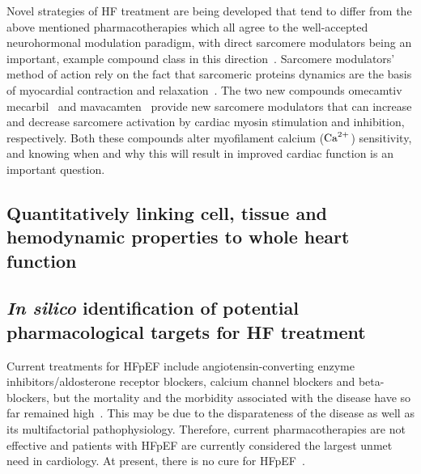 \vspace{0.2cm}
Novel strategies of HF treatment are being developed that tend to differ from the above mentioned pharmacotherapies which all agree to the well-accepted neurohormonal modulation paradigm, with direct sarcomere modulators being an important, example compound class in this direction~\cite{Tsukamoto:2020}. Sarcomere modulators' method of action rely on the fact that sarcomeric proteins dynamics are the basis of myocardial contraction and relaxation~\cite{Solaro:1998}. The two new compounds omecamtiv mecarbil~\cite{Teerlink:2016} and mavacamten~\cite{Olivotto:2020} provide new sarcomere modulators that can increase and decrease sarcomere activation by cardiac myosin stimulation and inhibition, respectively. Both these compounds alter myofilament calcium ($\textrm{Ca}^{2+}$) sensitivity, and knowing when and why this will result in improved cardiac function is an important question.


%
%
%
\subsection{Quantitatively linking cell, tissue and hemodynamic properties to whole heart function}


%
%
%
\subsection{\textit{In silico} identification of potential pharmacological targets for HF treatment}
Current treatments for HFpEF include angiotensin-converting enzyme inhibitors/aldosterone receptor blockers, calcium channel
blockers and beta-blockers, but the mortality and the morbidity associated with the
disease have so far remained high~\cite{Adamczak:2020}. This may be due to the disparateness of the disease as well as its multifactorial pathophysiology. Therefore, current pharmacotherapies are not effective and patients with HFpEF are
currently considered the largest unmet need in cardiology. At present, there is no cure for HFpEF~\cite{Owan:2006}.

